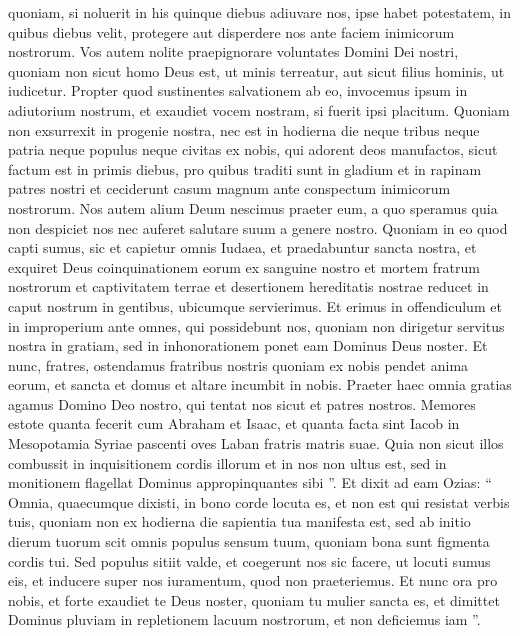 \begin{biblechapter}
\begin{biblechapter}
\begin{biblechapter}
\begin{biblechapter}
\begin{biblechapter}
\begin{biblechapter}
\begin{biblechapter}
\begin{biblechapter}
\verse quoniam, si noluerit in his quinque diebus adiuvare nos, ipse habet potestatem, in quibus diebus velit, protegere aut disperdere nos ante faciem inimicorum nostrorum. 
\verse Vos autem nolite praepignorare voluntates Domini Dei nostri, quoniam non sicut homo Deus est, ut minis terreatur, aut sicut filius hominis, ut iudicetur. 
\verse Propter quod sustinentes salvationem ab eo, invocemus ipsum in adiutorium nostrum, et exaudiet vocem nostram, si fuerit ipsi placitum.
 \verse Quoniam non exsurrexit in progenie nostra, nec est in hodierna die neque tribus neque patria neque populus neque civitas ex nobis, qui adorent deos manufactos, sicut factum est in primis diebus, 
\verse pro quibus traditi sunt in gladium et in rapinam patres nostri et ceciderunt casum magnum ante conspectum inimicorum nostrorum. 
\verse Nos autem alium Deum nescimus praeter eum, a quo speramus quia non despiciet nos nec auferet salutare suum a genere nostro.
 \verse Quoniam in eo quod capti sumus, sic et capietur omnis Iudaea, et praedabuntur sancta nostra, et exquiret Deus coinquinationem eorum ex sanguine nostro 
\verse et mortem fratrum nostrorum et captivitatem terrae et desertionem hereditatis nostrae reducet in caput nostrum in gentibus, ubicumque servierimus. Et erimus in offendiculum et in improperium ante omnes, qui possidebunt nos, 
\verse quoniam non dirigetur servitus nostra in gratiam, sed in inhonorationem ponet eam Dominus Deus noster. 
\verse Et nunc, fratres, ostendamus fratribus nostris quoniam ex nobis pendet anima eorum, et sancta et domus et altare incumbit in nobis.
 \verse Praeter haec omnia gratias agamus Domino Deo nostro, qui tentat nos sicut et patres nostros. 
\verse Memores estote quanta fecerit cum Abraham et Isaac, et quanta facta sint Iacob in Mesopotamia Syriae pascenti oves Laban fratris matris suae. 
\verse Quia non sicut illos combussit in inquisitionem cordis illorum et in nos non ultus est, sed in monitionem flagellat Dominus appropinquantes sibi ”.
 \verse Et dixit ad eam Ozias: “ Omnia, quaecumque dixisti, in bono corde locuta es, et non est qui resistat verbis tuis, 
\verse quoniam non ex hodierna die sapientia tua manifesta est, sed ab initio dierum tuorum scit omnis populus sensum tuum, quoniam bona sunt figmenta cordis tui. 
\verse Sed populus sitiit valde, et coegerunt nos sic facere, ut locuti sumus eis, et inducere super nos iuramentum, quod non praeteriemus. 
\verse Et nunc ora pro nobis, et forte exaudiet te Deus noster, quoniam tu mulier sancta es, et dimittet Dominus pluviam in repletionem lacuum nostrorum, et non deficiemus iam ”.

\end{biblechapter}
\end{biblechapter}
\end{biblechapter}
\end{biblechapter}
\end{biblechapter}
\end{biblechapter}
\end{biblechapter}
\end{biblechapter}
